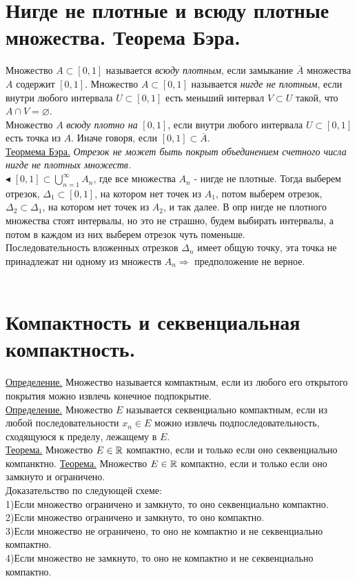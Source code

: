 \section{Нигде не плотные и всюду плотные множества. Теорема Бэра.}

Множество $A \subset [0,1]$ называется \textit{всюду плотным}, если замыкание $\overline{A}$ множества $A$ содержит $[0,1]$. Множество $A \subset [0,1]$ называется \textit{нигде не плотным}, если внутри любого интервала $U \subset [0,1]$ есть меньший интервал $V \subset U$ такой, что $A \cap V = \varnothing$.\\
Множество $A$ \textit{всюду плотно на } $[0,1]$, если внутри любого интервала $U \subset [0,1]$ есть точка из $A$. Иначе говоря, если $[0,1] \subset \overline{A}$. \\
\underline{Теормема Бэра.} \textit{Отрезок не может быть покрыт объединением счетного числа нигде не плотных множеств.}\\
$\blacktriangleleft$
 $[0,1] \subset \bigcup_{n=1}^\infty A_n$, где все множества $A_n$ - нигде не плотные.
Тогда выберем отрезок, $\Delta _1 \subset [0,1]$, на котором нет точек из $A_1$, потом выберем отрезок, $\Delta _2 \subset \Delta _1$, на котором нет точек из $A_2$, и так далее. В опр нигде не плотного множества стоят интервалы, но это не страшно, будем выбирать интервалы, а потом в каждом из них выберем отрезок чуть поменьше. \\ Последовательность вложенных отрезков $\Delta _n$ имеет общую точку, эта точка не принадлежат ни одному из множеств $A_n \Rightarrow$ предположение не верное.
\\
\\

\section{Компактность и секвенциальная компактность.}

\underline{Определение.} Множество называется компактным, если из любого его открытого покрытия можно извлечь конечное подпокрытие.\\
\underline{Определение.} Множество $E$ называется секвенциально компактным, если из любой последовательности $x_n \in E$ можно извлечь подпоследовательность, сходящуюся к пределу, лежащему в $E$.\\
\underline{Теорема.} Множество $E\in\mathbb{R}$ компактно, если и только если оно секвенциально компанктно.
\underline{Теорема.} Множество $E\in\mathbb{R}$ компактно, если и только если оно замкнуто и ограничено.\\
Доказательство по следующей схеме:\\
1)Если множество ограничено и замкнуто, то оно секвенциально компактно.\\
2)Если множество  ограничено и замкнуто, то оно компактно.\\
3)Если множество не ограничено, то оно не компактно и не секвенциально компактно.\\
4)Если множество не замкнуто, то оно не компактно и не секвенциально компактно.\\

